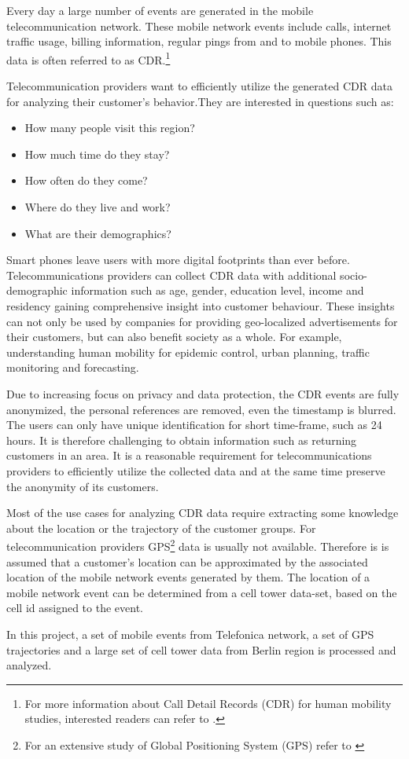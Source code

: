 Every day a large number of events are generated in the mobile telecommunication network. These mobile network events include calls, internet traffic usage, billing information, regular pings from and to mobile phones. This data is often referred to as CDR.\footnote{For more
information about Call Detail Records (CDR) for human mobility studies, interested readers can refer to \cite{spatiotemp}.} 

Telecommunication providers want to efficiently utilize the generated CDR data for analyzing their customer's behavior.They are interested in questions such as:
\begin{itemize}
\item How many people visit this region?
\item How much time do they stay?
\item How often do they come?
\item Where do they live and work?
\item What are their demographics?
\end{itemize}

Smart phones leave users with more digital footprints than ever before. Telecommunications providers can collect CDR data with additional socio-demographic information such as age, gender, education level, income and residency gaining comprehensive insight into customer behaviour. These insights can not only be used by companies for providing geo-localized advertisements for their customers, but can also benefit society as a whole. For example, understanding human mobility for epidemic control, urban planning, traffic monitoring and forecasting.

Due to increasing focus on privacy and data protection, the CDR events are fully anonymized, the personal references are removed, even the timestamp is blurred. The users can only have unique identification for short time-frame, such as 24 hours. It is therefore challenging to obtain information such as returning customers in an area. It is a reasonable requirement for telecommunications providers to efficiently utilize the collected data and at the same time preserve the anonymity of its customers. 

Most of the use cases for analyzing CDR data require extracting some knowledge about the location or the trajectory of the customer groups. For telecommunication providers GPS\footnote{For an extensive study of Global Positioning System (GPS) refer to \cite{gps}} data is usually not available. Therefore is is assumed that a customer's location can be approximated by the associated location of the mobile network events generated by them. The location of a mobile network event can be determined from a cell tower data-set, based on the cell id assigned to the event.

In this project, a set of mobile events from Telefonica network, a set of GPS trajectories and a large set of cell tower data from Berlin region is processed and analyzed. 


